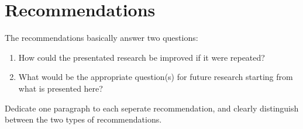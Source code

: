 \section{Recommendations}
The recommendations basically answer two questions:
\begin{enumerate}
\item How could the presentated research be improved if it were repeated?
\item What would be the appropriate question(s) for future research starting from what is presented here?  
\end{enumerate} 
Dedicate one paragraph to each seperate recommendation, and clearly distinguish between the two types of recommendations.